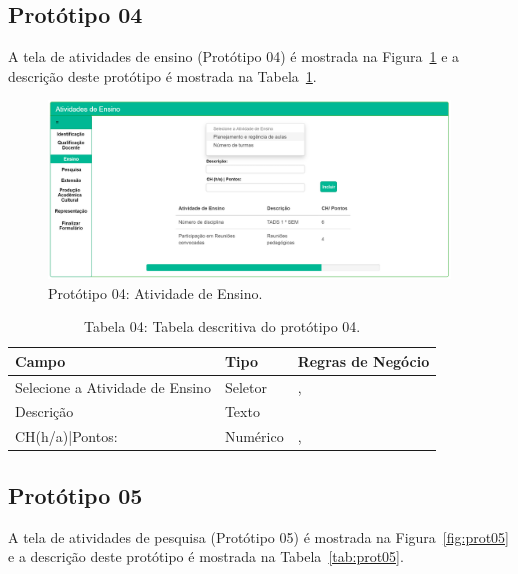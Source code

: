 \newpage
\subsection{Protótipo 04}\label{prototipo04}
A tela de atividades de ensino (Protótipo 04) é mostrada na Figura~\ref{fig:prot04} e a descrição deste protótipo é mostrada na Tabela~\ref{tab:prot04}.

\begin{figure}[H]
    \centering
    \includegraphics[width=0.95\textwidth]{img/4pagina_atividades_de_ensino.png}
    \caption[Protótipo 04: Atividade de Ensino]{Protótipo 04: Atividade de Ensino.}
    \label{fig:prot04}
\end{figure}

\begin{table}[H]
\centering
\caption[Tabela 04: Tabela descritiva do protótipo 04.]{Tabela 04: Tabela descritiva do protótipo 04.}
\label{tab:prot04}
\begin{tabular}{@{}lll@{}}
\toprule
Campo                           & Tipo     &  Regras de Negócio             \\ \midrule
Selecione a Atividade de Ensino & Seletor  &    \nameref{rn007}, \nameref{rn019}     \\
Descrição                       & Texto    &    \nameref{rn007}                 \\
CH(h/a)|Pontos:                 & Numérico &    \nameref{rn007}, \nameref{rn020}     \\ \bottomrule
\end{tabular}
\end{table}

\newpage
\subsection{Protótipo 05}\label{prototipo05}
A tela de atividades de pesquisa (Protótipo 05) é mostrada na Figura~\ref{fig:prot05} e a descrição deste protótipo é mostrada na Tabela~\ref{tab:prot05}.


